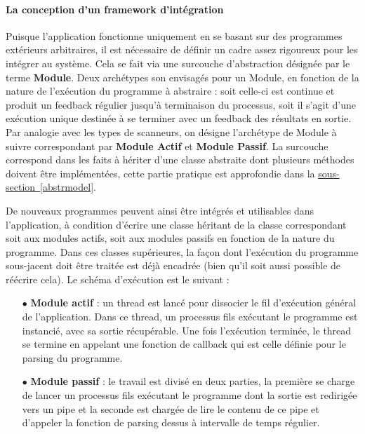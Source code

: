 \documentclass[]{article}
\newcommand{\wordlink}[2]{\hyperref[#1]{#2~\ref{#1}}}
\begin{document}
\vspace{1cm}

\paragraph{La conception d'un framework d'intégration}

Puisque l'application fonctionne uniquement en se basant sur des programmes extérieurs arbitraires, il est nécessaire de définir un cadre assez rigoureux pour les intégrer au système. Cela se fait via une surcouche d'abstraction désignée par le terme \textbf{Module}. Deux archétypes son envisagés pour un Module, en fonction de la nature de l'exécution du programme à abstraire : soit celle-ci est continue et produit un feedback régulier jusqu'à terminaison du processus, soit il s'agit d'une exécution unique destinée à se terminer avec un feedback des résultats en sortie. Par analogie avec les types de scanneurs, on désigne l'archétype de Module à suivre correspondant par \textbf{Module Actif} et \textbf{Module Passif}. La surcouche correspond dans les faits à hériter d'une classe abstraite dont plusieurs méthodes doivent être implémentées, cette partie pratique est approfondie dans la \wordlink{abstrmodel}{sous-section}.\\

\par De nouveaux programmes peuvent ainsi être intégrés et utilisables dans l'application, à condition d'écrire une classe héritant de la classe correspondant soit aux modules actifs, soit aux modules passifs en fonction de la nature du programme. Dans ces classes supérieures, la façon dont l'exécution du programme sous-jacent doit être traitée est déjà encadrée (bien qu'il soit aussi possible de réécrire cela). Le schéma d'exécution est le suivant :
\vspace{0.2cm}
\begin{itemize}
\item[$\bullet$] \textbf{Module actif} : un thread est lancé pour dissocier le fil d'exécution général de l'application. Dans ce thread, un processus fils exécutant le programme est instancié, avec sa sortie récupérable. Une fois l'exécution terminée, le thread se termine en appelant une fonction de callback qui est celle définie pour le parsing du programme.
\vspace{0.2cm}
\item[$\bullet$] \textbf{Module passif} : le travail est divisé en deux parties, la première se charge de lancer un processus fils exécutant le programme dont la sortie est redirigée vers un pipe et la seconde est chargée de lire le contenu de ce pipe et d'appeler la fonction de parsing dessus à intervalle de temps régulier.
\end{itemize}
\vspace{0.4cm}
\end{document}
